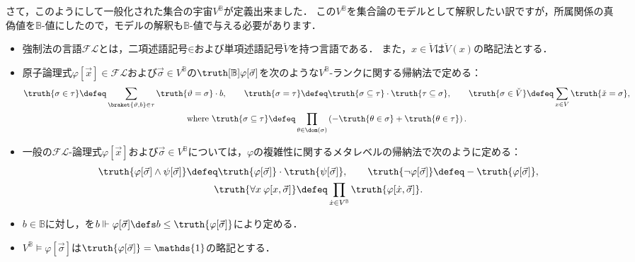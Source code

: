 \documentclass[a4j]{ltjsarticle}
\renewcommand{\emph}[1]{\textbf{\textgt{#1}}}
\newcommand{\FL}{\mathord{\mathcal{F\!L}}}
\begin{document}
さて，このようにして一般化された集合の宇宙$V^{\mathbb{B}}$が定義出来ました．
この$V^{\mathbb{B}}$を集合論のモデルとして解釈したい訳ですが，所属関係の真偽値を$\mathbb{B}$-値にしたので，モデルの解釈も$\mathbb{B}$-値で与える必要があります．

\begin{definition}
 \begin{itemize}
  \item 強制法の言語$\FL$とは，二項述語記号$\mathord{\in}$および単項述語記号$\check{V}$を持つ言語である．
        また，$x \in \check{V}$は$\check{V}(x)$の略記法とする．
  \item 原子論理式$\varphi[\vec{x}] \in \FL$および$\vec{\sigma} \in V^{\mathbb{B}}$の\emph{真偽値}$\truth[\mathbb{B}]{\varphi[\vec{\sigma}]}$を次のような$V^{\mathbb{B}}$-ランクに関する帰納法で定める：
        \begin{gather*}
         \truth{\sigma \in \tau} \defeq \sum_{\braket{\vartheta, b} \in \tau} \truth{\vartheta = \sigma} \cdot b, \qquad
         \truth{\sigma = \tau} \defeq \truth{\sigma \subseteq \tau} \cdot \truth{\tau \subseteq \sigma},\qquad
         \truth{\sigma \in \check{V}} \defeq \sum_{x \in V} \truth{\check{x} = \sigma},\\
         \text{where }
         \truth{\sigma \subseteq \tau} \defeq \prod_{\theta \in \dom(\sigma)} \left(- \truth{\theta \in \sigma} + \truth{\theta \in \tau}\right).
        \end{gather*}
  \item 一般の$\FL$-論理式$\varphi[\vec{x}]$および$\vec{\sigma} \in V^{\mathbb{B}}$については，$\varphi$の複雑性に関するメタレベルの帰納法で次のように定める：
        \begin{gather*}
         \truth{\varphi[\vec{\sigma}] \wedge \psi[\vec{\sigma}] } \defeq \truth{\varphi[\vec{\sigma}]} \cdot \truth{\psi[\vec{\sigma}]}, \qquad
         \truth{\neg \varphi[\vec{\sigma}]} \defeq - \truth{\varphi[\vec{\sigma}]},\\
         \truth{\forall x \: \varphi[x, \vec{\sigma}]}
         \defeq \prod_{\dot{x} \in V^{\mathbb{B}}} \truth{\varphi[\dot{x}, \vec{\sigma}]}.
        \end{gather*}
  \item $b \in \mathbb{B}$に対し，\emph{強制関係}を$b \Vdash \varphi[\vec{\sigma}] \defs b \leq \truth{\varphi[\vec{\sigma}]}$により定める．
  \item $V^{\mathbb{B}} \models \varphi[\vec{\sigma}]$は$\truth{\varphi[\vec{\sigma}]} = \mathds{1}$の略記とする．
 \end{itemize}
\end{definition}
\end{document}
